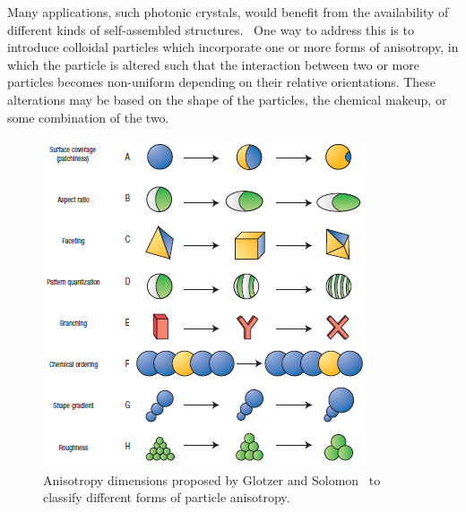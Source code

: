 Many applications, such photonic crystals, would benefit from the availability of different
kinds of self-assembled structures.~\cite{glotzer-solomon}  One way to address this is to 
introduce colloidal particles which incorporate one or more forms of anisotropy, in which the 
particle is altered such that the interaction between two or more particles becomes non-uniform depending on 
their relative orientations.  These alterations may be based on the shape of the particles, the chemical makeup, or 
some combination of the two.

\begin{figure}[h]
\begin{center}
\includegraphics{figures/glotzer-anisotropy-dimensions.png}
\end{center}
\caption{Anisotropy dimensions proposed by Glotzer and Solomon~\cite{glotzer-solomon} to classify 
different forms of particle anisotropy.}
\label{fig:glotzer-dimensions}
\end{figure}


